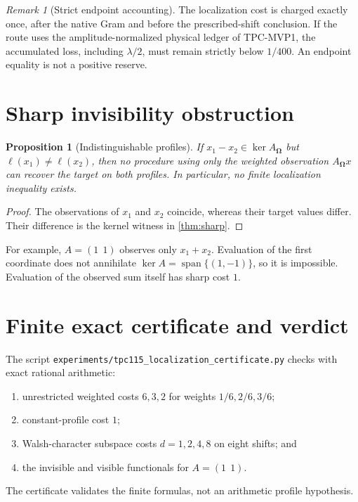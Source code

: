 \documentclass[11pt]{article}
\newtheorem{proposition}[theorem]{Proposition}
\theoremstyle{definition}
\theoremstyle{remark}
\newtheorem{remark}[theorem]{Remark}
\newcommand{\Om}{\boldsymbol\Omega}
\begin{document}
\begin{remark}[Strict endpoint accounting]
The localization cost is charged exactly once, after the native Gram
and before the prescribed-shift conclusion.  If the route uses the
amplitude-normalized physical ledger of TPC-MVP1, the accumulated
loss, including \(\lambda/2\), must remain strictly below \(1/400\).
An endpoint equality is not a positive reserve.
\end{remark}

\section{Sharp invisibility obstruction}

\begin{proposition}[Indistinguishable profiles]
\label{prop:invisible}
If \(x_1-x_2\in\ker A_{\Om}\) but
\(\ell(x_1)\ne\ell(x_2)\), then no procedure using only the weighted
observation \(A_{\Om}x\) can recover the target on both profiles.  In
particular, no finite localization inequality exists.
\end{proposition}

\begin{proof}
The observations of \(x_1\) and \(x_2\) coincide, whereas their target
values differ.  Their difference is the kernel witness in
\cref{thm:sharp}.
\end{proof}

For example, \(A=(1\ \ 1)\) observes only \(x_1+x_2\).  Evaluation of
the first coordinate does not annihilate
\(\ker A=\operatorname{span}\{(1,-1)\}\), so it is impossible.
Evaluation of the observed sum itself has sharp cost \(1\).

\section{Finite exact certificate and verdict}

The script
\texttt{experiments/tpc115\_localization\_certificate.py} checks with
exact rational arithmetic:
\begin{enumerate}[leftmargin=2em]
\item unrestricted weighted costs \(6,3,2\) for weights
  \(1/6,2/6,3/6\);
\item constant-profile cost \(1\);
\item Walsh-character subspace costs \(d=1,2,4,8\) on eight shifts;
  and
\item the invisible and visible functionals for \(A=(1\ \ 1)\).
\end{enumerate}
The certificate validates the finite formulas, not an arithmetic
profile hypothesis.
\end{document}
